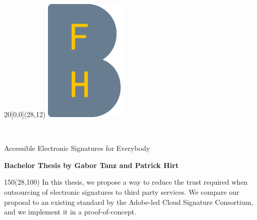 %
%

\begin{titlepage}


\setlength{\unitlength}{1mm}
\begin{textblock}{20}[0,0](28,12)
	\includegraphics[scale=1.0]{images/BFH_Logo_B.png}
\end{textblock}

\begin{flushleft}

\vspace*{21mm}

\fontsize{26pt}{40pt}\selectfont 
\heading				\\							%
\vspace{2mm}

\fontsize{16pt}{24pt}\selectfont\vspace{0.3em}
Accessible Electronic Signatures for Everybody 			\\				%
\vspace{5mm}

\fontsize{10pt}{12pt}\selectfont
\textbf{Bachelor Thesis by Gabor Tanz and Patrick Hirt} \\		%
\vspace{7mm}

\begin{textblock}{150}(28,100)
\fontsize{10pt}{12pt}\selectfont
    In this thesis, we propose a way to reduce the trust required when outsourcing of electronic signatures to third party services.
    We compare our proposal to an existing standard by the Adobe-led Cloud Signature Consortium,
    and we implement it in a proof-of-concept.
\end{textblock}


\end{flushleft}
\end{titlepage}
